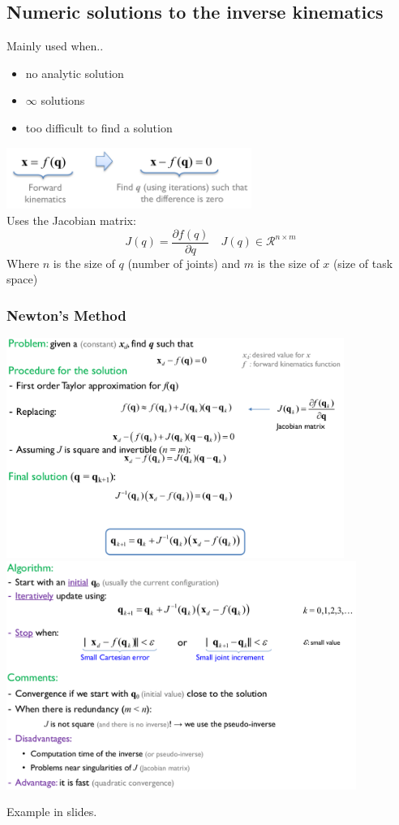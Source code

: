 \subsection{Numeric solutions to the inverse kinematics}
Mainly used when..
\begin{itemize}
	\item no analytic solution
	\item $ \infty $ solutions
	\item too difficult to find a solution
\end{itemize}
{\centering 
\includegraphics[width=8cm]{sections/imgs/20.png}
\\}
Uses the Jacobian matrix:
\[J (q) = \frac{\partial f (q)}{\partial q} \quad J (q) \in \mathcal{R}^{n \times m}  \]
Where $ n $ is the size of $ q $ (number of joints) and $ m $ is the size of $ x $ (size of task space)

\subsubsection{Newton's Method}

\begin{center}
	\includegraphics[width=11cm]{sections/imgs/21.png}\\
	\includegraphics[width=11.4cm]{sections/imgs/22.png}
\end{center}
Example in slides.

